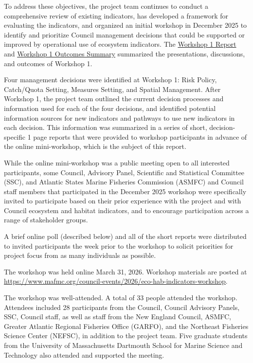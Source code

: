 \documentclass[
]{article}
\begin{document}
To address these objectives, the project team continues to conduct a comprehensive review of existing indicators, has developed a framework for evaluating the indicators, and organized an initial workshop in December 2025 to identify and prioritize Council management decisions that could be supported or improved by operational use of ecosystem indicators. The \href{https://www.mafmc.org/s/WK1_Report.pdf}{Workshop 1 Report} and \href{https://www.mafmc.org/s/WK1_Results-Summary.pdf}{Workshop 1 Outcomes Summary} summarized the presentations, discussions, and outcomes of Workshop 1.

Four management decisions were identified at Workshop 1: Risk Policy, Catch/Quota Setting, Measures Setting, and Spatial Management. After Workshop 1, the project team outlined the current decision processes and information used for each of the four decisions, and identified potential information sources for new indicators and pathways to use new indicators in each decision. This information was summarized in a series of short, decision-specific 1 page reports that were provided to workshop participants in advance of the online mini-workshop, which is the subject of this report.

While the online mini-workshop was a public meeting open to all interested participants, some Council, Advisory Panel, Scientific and Statistical Committee (SSC), and Atlantic States Marine Fisheries Commission (ASMFC) and Council staff members that participated in the December 2025 workshop were specifically invited to participate based on their prior experience with the project and with Council ecosystem and habitat indicators, and to encourage participation across a range of stakeholder groups.

A brief online poll (described below) and all of the short reports were distributed to invited participants the week prior to the workshop to solicit priorities for project focus from as many individuals as possible.

The workshop was held online March 31, 2026. Workshop materials are posted at \url{https://www.mafmc.org/council-events/2026/eco-hab-indicators-workshop}.

The workshop was well-attended. A total of 33 people attended the workshop. Attendees included 28 participants from the Council, Council Advisory Panels, SSC, Council staff, as well as staff from the New England Council, ASMFC, Greater Atlantic Regional Fisheries Office (GARFO), and the Northeast Fisheries Science Center (NEFSC), in addition to the project team. Five graduate students from the University of Massachusetts Dartmouth School for Marine Science and Technology also attended and supported the meeting.
\end{document}
